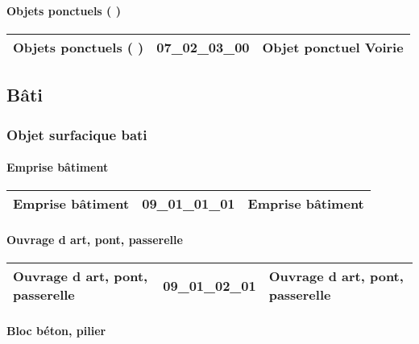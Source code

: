 \documentclass[12pt,titlepage]{book}
\begin{document}
\paragraph{Objets ponctuels ( )}
\noindent
\vspace{\baselineskip}

\renewcommand{\arraystretch}{1.2}
\begin{supertabular}{|p{10cm}|c|p{15cm}|}
 Objets ponctuels ( ) & 07\_02\_03\_00 & Objet ponctuel Voirie\\
\hline
\end{supertabular}
\subsection{Bâti}
\subsubsection{\large Objet surfacique bati}
\paragraph{Emprise bâtiment}
\noindent
\vspace{\baselineskip}

\renewcommand{\arraystretch}{1.2}
\begin{supertabular}{|p{10cm}|c|p{15cm}|}
 Emprise bâtiment & 09\_01\_01\_01 & Emprise bâtiment\\
\hline
\end{supertabular}


\paragraph{Ouvrage d art, pont, passerelle}
\noindent
\vspace{\baselineskip}

\renewcommand{\arraystretch}{1.2}
\begin{supertabular}{|p{10cm}|c|p{15cm}|}
 Ouvrage d art, pont, passerelle & 09\_01\_02\_01 & Ouvrage d art, pont, passerelle\\
\hline
\end{supertabular}


\paragraph{Bloc béton, pilier}
\noindent
\vspace{\baselineskip}
\end{document}
